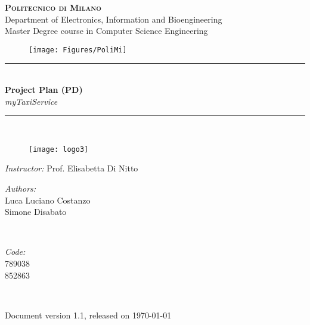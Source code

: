 \documentclass[12pt]{report}
\begin{document}
\pagestyle{empty}

\cleardoublepage


\begin{titlepage}

\newcommand{\HRule}{\rule{\linewidth}{0.5mm}} %

\center %

\textsc{\huge \bf{Politecnico di Milano}}\\[0.5cm]
\textsf{\Large Department of Electronics, Information and Bioengineering}\\[0.25cm] %
\textsf{\large Master Degree course in Computer Science Engineering}\\[0.5cm] %

\begin{figure}[h]
	\centering
	\texttt{[image: Figures/PoliMi]}
\end{figure}


\HRule \\

\LARGE \textbf {Project Plan (PD)} \\[0.2cm]
\large \textit {myTaxiService}
\\ %
\HRule \\

\begin{figure}[h]
	\center
	\texttt{[image: logo3]}
\end{figure}

\begin{flushleft}
	\large \textit{Instructor:} Prof. Elisabetta Di Nitto \\[0.5cm]

	\begin{minipage}{0.45\textwidth}
	\begin{flushleft} \large
	\emph{Authors:}\\
	Luca Luciano Costanzo\\
	Simone Disabato
	\end{flushleft}
	\end{minipage}
	~
	\begin{minipage}{0.45\textwidth}
	\begin{flushright} \large
	\emph{Code:} \\
	789038\\
	852863
	\end{flushright}
	\end{minipage} \\[1cm]

\end{flushleft} 

{\large Document version 1.1, released on \today} %

\vfill %

\end{titlepage}
\end{document}
